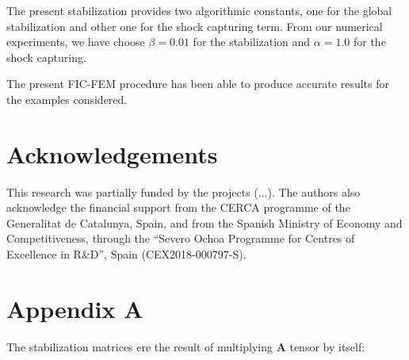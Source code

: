 \documentclass[a4paper,12pt]{article}
\begin{document}
The present stabilization provides two algorithmic constants, one for the global stabilization and other one for the shock capturing term. From our numerical experiments, we have choose $\beta=0.01$ for the stabilization and $\alpha=1.0$ for the shock capturing.

The present FIC-FEM procedure has been able to produce accurate results for the examples considered.



\section{Acknowledgements}

This research was partially funded by the projects (...). The authors also acknowledge the financial support from the CERCA programme of the Generalitat de Catalunya, Spain, and from the Spanish Ministry of Economy and Competitiveness, through the “Severo Ochoa Programme for Centres of Excellence in R\&D”, Spain (CEX2018-000797-S).



\section*{Appendix A}

The stabilization matrices ere the result of multiplying $\mathbf{A}$ tensor by itself:
\end{document}
